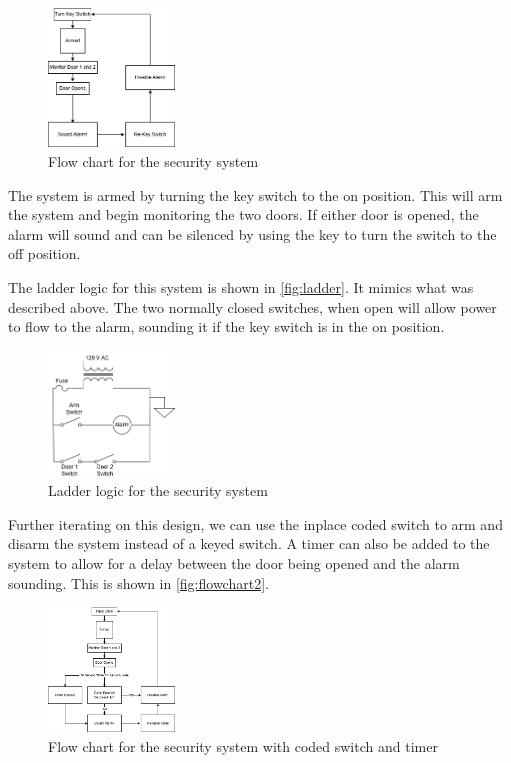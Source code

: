 \documentclass{article}
\begin{document}
\begin{figure}[ht!]
    \centering
    \includegraphics[width=0.3\textwidth]{flowchart1.png}
    \caption{Flow chart for the security system}
    \label{fig:flowchart}
\end{figure}

The system is armed by turning the key switch to the on position. This will arm the system and begin monitoring the two doors. If either door is opened, the alarm will sound and can be silenced by using the key to turn the switch to the off position. 

The ladder logic for this system is shown in \autoref{fig:ladder}. It mimics what was described above. The two normally closed switches, when open will allow power to flow to the alarm, sounding it if the key switch is in the on position.

\begin{figure}[ht!]
    \centering
    \includegraphics[width=0.3\textwidth]{ladder.png}
    \caption{Ladder logic for the security system}
    \label{fig:ladder}
\end{figure}

Further iterating on this design, we can use the inplace coded switch to arm and disarm the system instead of a keyed switch. A timer can also be added to the system to allow for a delay between the door being opened and the alarm sounding. This is shown in \autoref{fig:flowchart2}.

\begin{figure}[ht!]
    \centering
    \includegraphics[width=0.3\textwidth]{flowchart2.png}
    \caption{Flow chart for the security system with coded switch and timer}
    \label{fig:flowchart2}
\end{figure}
\end{document}
